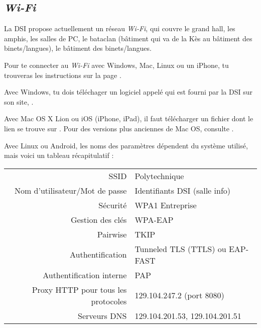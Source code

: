 \subsection{\emph{Wi-Fi}}
La DSI propose actuellement un r\'eseau \emph{Wi-Fi}, qui couvre le grand hall, les amphis, les salles de PC, le bataclan (b\^atiment qui va de la K\`es au b\^atiment des
binets/langues), le b\^atiment des binets/langues.

Pour te connecter au \emph{Wi-Fi} avec Windows, Mac, Linux ou un iPhone, tu trouveras les instructions sur la page .

Avec Windows, tu dois t\'el\'echager un logiciel appel\'e  qui est fourni par la DSI sur son site, .

Avec Mac OS X Lion ou iOS (iPhone, iPad), il faut t\'el\'echarger un fichier 
\newline {} dont le lien se trouve sur . Pour des versions plus anciennes de Mac OS, consulte .

Avec Linux ou Android, les noms des param\`etres d\'ependent du syst\`eme utilis\'e, mais voici un tableau r\'ecapitulatif :
\begin{center}
\begin{tabular}{r|l}
 SSID & Polytechnique \\
 Nom d'utilisateur/Mot de passe & Identifiants DSI (salle info) \\
 S\'ecurit\'e & WPA1 Entreprise \\
 Gestion des cl\'es & WPA-EAP \\
 Pairwise & TKIP \\
 Authentification & Tunneled TLS (TTLS) ou EAP-FAST \\
 Authentification interne & PAP \\
 Proxy HTTP pour tous les protocoles & 129.104.247.2 (port 8080) \\
 Serveurs DNS & 129.104.201.53, 129.104.201.51
\end{tabular}
\end{center}






